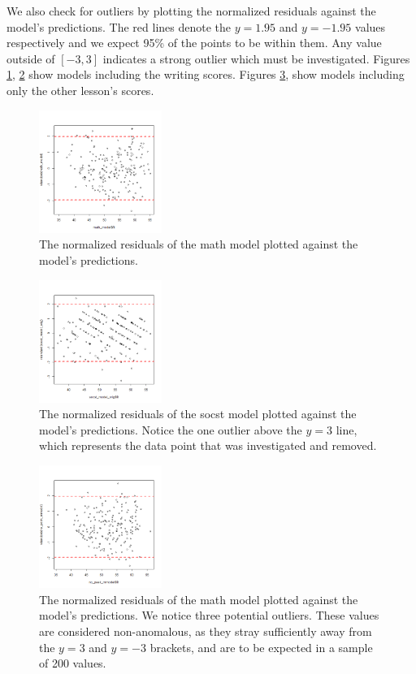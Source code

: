 \documentclass[10pt]{article}
\begin{document}
	We also check for outliers by plotting the normalized residuals against the model's predictions. The red lines denote the $y=1.95$ and $y=-1.95$ values respectively and we expect 95\% of the points to be within them. Any value outside of $[-3,3]$ indicates a strong outlier which must be investigated. Figures \ref{fig::lm_math_plot}, \ref{fig::lm_socst_plot} show models including the writing scores. Figures \ref{fig::lm_math_nopeeking_plot}, show models including only the other lesson's scores.
	
	 \begin{figure}
	 	\includegraphics[width=4cm]{lm_math_residual_plot.png}
	 	\centering
	 	\caption{The normalized residuals of the math model plotted against the model's predictions.}
	 	\label{fig::lm_math_plot}
	 \end{figure}
 
	 \begin{figure}
	 	\includegraphics[width=4cm]{lm_socst_residual_plot.png}
	 	\centering
	 	\caption{The normalized residuals of the socst model plotted against the model's predictions. Notice the one outlier above the $y=3$ line, which represents the data point that was investigated and removed.}
	 	\label{fig::lm_socst_plot}
	 \end{figure}
 
	 \begin{figure}
	 	\includegraphics[width=4cm]{lm_math_nopeeking_residual_plot.png}
	 	\centering
	 	\caption{The normalized residuals of the math model plotted against the model's predictions. We notice three potential outliers. These values are considered non-anomalous, as they stray sufficiently away from the $y=3$ and $y=-3$ brackets, and are to be expected in a sample of 200 values.}
	 	\label{fig::lm_math_nopeeking_plot}
	 \end{figure}
	
\end{document}
